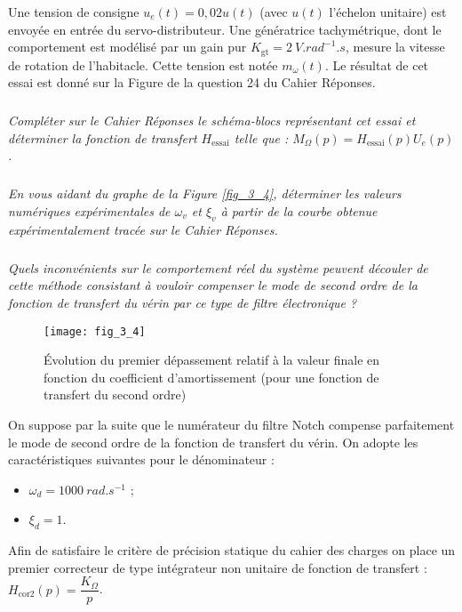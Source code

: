 Une tension de consigne $u_e(t) = 0,02u(t)$ (avec $u(t)$ l'échelon unitaire) est envoyée en entrée du servo-distributeur. Une génératrice tachymétrique, dont le comportement est modélisé par un gain pur $K_{\text{gt}} = \SI{2}{V.rad^{-1}.s}$, mesure la vitesse de rotation de l'habitacle. Cette tension est notée $m_{\omega}(t)$. Le résultat de cet essai est donné sur la Figure de la question 24 du Cahier Réponses.


\subparagraph{}
\textit{Compléter sur le Cahier Réponses le schéma-blocs représentant cet essai et déterminer la fonction de transfert $H_{\text{essai}}$ telle que : $M_{\Omega}(p) = H_{\text{essai}}(p)U_e(p)$.}
\ifprof
\begin{corrige}
\end{corrige}
\else
\fi


 
\subparagraph{}
\textit{En vous aidant du graphe de la Figure \autoref{fig_3_4}, déterminer les valeurs numériques expérimentales de $\omega_v$ et 
$\xi_v$ à partir de la courbe obtenue expérimentalement tracée sur le Cahier Réponses.}
\ifprof
\begin{corrige}
\end{corrige}
\else
\fi

\subparagraph{}
\textit{Quels inconvénients sur le comportement réel du système peuvent découler de cette méthode consistant à vouloir compenser le mode de second ordre de la fonction de transfert du vérin par ce type de filtre électronique ?}
\ifprof
\begin{corrige}
\end{corrige}
\else
\fi


\begin{figure}[H]
\centering
\texttt{[image: fig\_3\_4]}
\caption{Évolution du premier dépassement relatif à la valeur finale en fonction du coefficient d'amortissement (pour une fonction de transfert du second ordre)}
\label{fig_3_4}
\end{figure}


On suppose par la suite que le numérateur du filtre Notch compense parfaitement le mode de second ordre de la fonction de transfert du vérin. On adopte les caractéristiques suivantes pour le dénominateur :
\begin{itemize}
\item $\omega_d = \SI{1000}{rad.s^{-1}}$ ;
\item $\xi_d = 1$.
\end{itemize}

Afin de satisfaire le critère de précision statique du cahier des charges on place un premier correcteur de type intégrateur non unitaire de fonction de transfert :
$H_{\text{cor2}}(p)=\dfrac{K_{\Omega}}{p}$.

